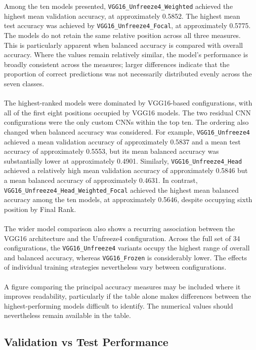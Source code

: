 \documentclass[12pt, a4paper]{report}
\let\oldsubsection\subsection
\renewcommand{\subsection}{%
    \Needspace{6\baselineskip}%
    \oldsubsection
}
\begin{document}
				Among the ten models presented, \texttt{VGG16\_Unfreeze4\_Weighted} achieved the highest mean validation accuracy, at approximately 0.5852. The highest mean test accuracy was achieved by \texttt{VGG16\_Unfreeze4\_Focal}, at approximately 0.5775. The models do not retain the same relative position across all three measures. This is particularly apparent when balanced accuracy is compared with overall accuracy. Where the values remain relatively similar, the model's performance is broadly consistent across the measures; larger differences indicate that the proportion of correct predictions was not necessarily distributed evenly across the seven classes.\\\\
				The highest-ranked models were dominated by VGG16-based configurations, with all of the first eight positions occupied by VGG16 models. The two residual CNN configurations were the only custom CNNs within the top ten. The ordering also changed when balanced accuracy was considered. For example, \texttt{VGG16\_Unfreeze4} achieved a mean validation accuracy of approximately 0.5837 and a mean test accuracy of approximately 0.5553, but its mean balanced accuracy was substantially lower at approximately 0.4901. Similarly, \texttt{VGG16\_Unfreeze4\_Head} achieved a relatively high mean validation accuracy of approximately 0.5846 but a mean balanced accuracy of approximately 0.4631. In contrast, \\\texttt{VGG16\_Unfreeze4\_Head\_Weighted\_Focal} achieved the highest mean balanced accuracy among the ten models, at approximately 0.5646, despite occupying sixth position by Final Rank.\\\\
				The wider model comparison also shows a recurring association between the VGG16 architecture and the Unfreeze4 configuration. Across the full set of 34 configurations, the \texttt{VGG16\_Unfreeze4} variants occupy the highest range of overall and balanced accuracy, whereas \texttt{VGG16\_Frozen} is considerably lower. The effects of individual training strategies nevertheless vary between configurations.\\\\
				A figure comparing the principal accuracy measures may be included where it improves readability, particularly if the table alone makes differences between the highest-performing models difficult to identify. The numerical values should nevertheless remain available in the table.
				
			\subsection{Validation vs Test Performance}
				
\end{document}
